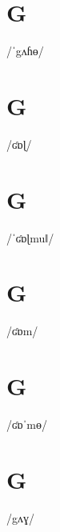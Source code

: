 \documentclass[10pt,a4paper,twoside]{book}
\begin{document}
\section*{G}

\begin{multicols}{3}
 {/ˈgʌɦɵ/} {}
\end{multicols}

\section*{G}

\begin{multicols}{3}
 {/ʛɒɭ/} {}
\end{multicols}

\section*{G}

\begin{multicols}{3}
 {/ˈʛɒɭmuǁ/} {}
\end{multicols}

\section*{G}

\begin{multicols}{3}
 {/ʛɒm/} {}
\end{multicols}

\section*{G}

\begin{multicols}{3}
 {/ʛɒˈmɵ/} {}
\end{multicols}

\section*{G}

\begin{multicols}{3}
 {/gʌɣ/} {}
\end{multicols}
\end{document}
